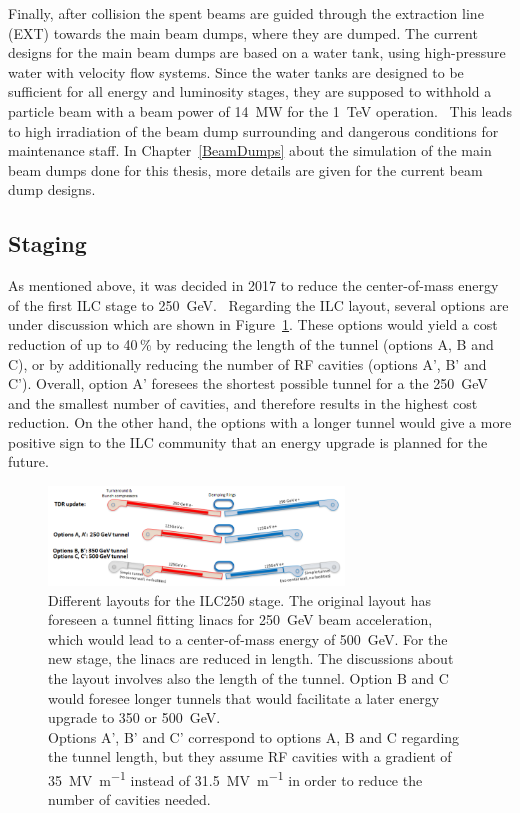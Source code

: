 Finally, after collision the spent beams are guided through the extraction line (EXT) towards the main beam dumps, where they are dumped.
The current designs for the main beam dumps are based on a water tank, using high-pressure water with velocity flow systems.
Since the water tanks are designed to be sufficient for all energy and luminosity stages, they are supposed to withhold a particle beam with a beam power of \SI{14}{\mega\watt} for the \SI{1}{\TeV} operation.~\cite[p. 18]{TDR32}
This leads to high irradiation of the beam dump surrounding and dangerous conditions for maintenance staff.
In Chapter~\ref{BeamDumps} about the simulation of the main beam dumps done for this thesis, more details are given for the current beam dump designs.

\subsection{Staging}
As mentioned above, it was decided in 2017 to reduce the center-of-mass energy of the first ILC stage to \SI{250}{\GeV}.~\cite{ICFA_Statement}
Regarding the ILC layout, several options are under discussion which are shown in Figure~\ref{fig:Staging}.
These options would yield a cost reduction of up to 40\,\% by reducing the length of the tunnel (options A, B and C), or by additionally reducing the number of RF cavities (options A', B' and C').
Overall, option A' foresees the shortest possible tunnel for a the \SI{250}{\GeV} and the smallest number of cavities, and therefore results in the highest cost reduction.
On the other hand, the options with a longer tunnel would give a more positive sign to the ILC community that an energy upgrade is planned for the future.
\begin{figure}[h]
\centering
\includegraphics[width=0.7\textwidth]{Figures/Staging.png}
\caption[Different layouts for the ILC250 stage]{Different layouts for the ILC250 stage.
The original layout has foreseen a tunnel fitting linacs for \SI{250}{\GeV} beam acceleration, which would lead to a center-of-mass energy of \SI{500}{\GeV}.
For the new stage, the linacs are reduced in length.
The discussions about the layout involves also the length of the tunnel.
Option B and C would foresee longer tunnels that would facilitate a later energy upgrade to 350 or \SI{500}{\GeV}.\\
Options A', B' and C' correspond to options A, B and C regarding the tunnel length, but they assume RF cavities with a gradient of \SI{35}{\mega\volt\per\meter} instead of \SI{31.5}{\mega\volt\per\meter} in order to reduce the number of cavities needed.~\cite[p. 19]{Staging}}
\label{fig:Staging}
\end{figure}
